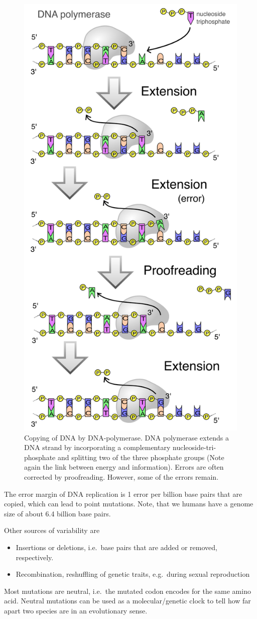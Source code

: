 \documentclass[
  11pt,
]{book}
\providecommand{\tightlist}{%
  \setlength{\itemsep}{0pt}\setlength{\parskip}{0pt}}
\begin{document}
\begin{figure}

{\centering \includegraphics[width=0.45\linewidth]{./figs/DNA_polymerase} 

}

\caption{Copying of DNA by DNA-polymerase. DNA polymerase extends a DNA strand by incorporating a complementary nucleoside-tri-phosphate and splitting two of the three phosphate groups  (Note again the link between energy and information). Errors are often corrected by proofreading. However, some of the errors remain.}\label{fig:dnaPolymerase}
\end{figure}

The error margin of DNA replication is 1 error per billion base pairs that are copied, which can lead to point mutations. Note, that we humans have a genome size of about 6.4 billion base pairs.

Other sources of variability are

\begin{itemize}
\tightlist
\item
  Insertions or deletions, i.e.~base pairs that are added or removed, respectively.
\item
  Recombination, reshuffling of genetic traits, e.g.~during sexual reproduction
\end{itemize}

Most mutations are neutral, i.e.~the mutated codon encodes for the same amino acid. Neutral mutations can be used as a molecular/genetic clock to tell how far apart two species are in an evolutionary sense.
\end{document}

